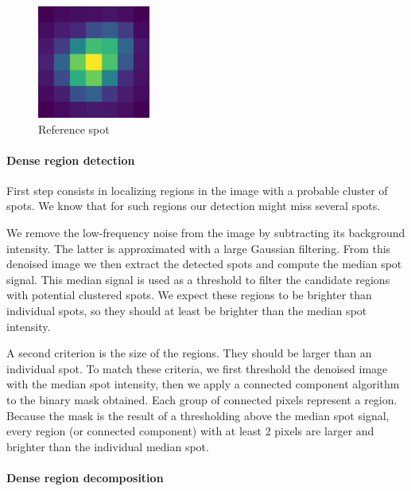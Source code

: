 \begin{figure}
	\begin{center}
		\includegraphics[width=0.33\textwidth]{figures/chapter2/reference_spot}
	\caption{Reference spot}
	\label{fig:reference_spot}
	\end{center}
\end{figure}

\paragraph{Dense region detection}

First step consists in localizing regions in the image with a probable cluster of spots.
We know that for such regions our detection might miss several spots.

We remove the low-frequency noise from the image by subtracting its background intensity.
The latter is approximated with a large Gaussian filtering.
From this denoised image we then extract the detected spots and compute the median spot signal.
This median signal is used as a threshold to filter the candidate regions with potential clustered spots.
We expect these regions to be brighter than individual spots, so they should at least be brighter than the median spot intensity.

A second criterion is the size of the regions.
They should be larger than an individual spot.
To match these criteria, we first threshold the denoised image with the median spot intensity, then we apply a connected component algorithm\cite{wu_connected_component_2005} to the binary mask obtained.
Each group of connected pixels represent a region.
Because the mask is the result of a thresholding above the median spot signal, every region (or connected component) with at least 2 pixels are larger and brighter than the individual median spot.

\paragraph{Dense region decomposition}

